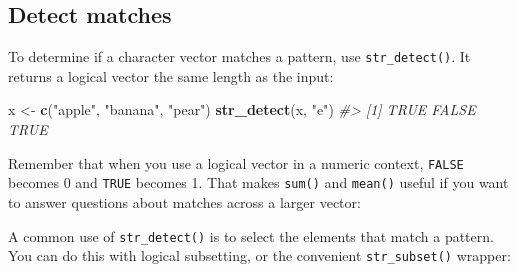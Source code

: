 \documentclass[]{book}
\newenvironment{Shaded}{\begin{snugshade}}{\end{snugshade}}
\newcommand{\CommentTok}[1]{\textcolor[rgb]{0.56,0.35,0.01}{\textit{#1}}}
\newcommand{\DecValTok}[1]{\textcolor[rgb]{0.00,0.00,0.81}{#1}}
\newcommand{\KeywordTok}[1]{\textcolor[rgb]{0.13,0.29,0.53}{\textbf{#1}}}
\newcommand{\NormalTok}[1]{#1}
\newcommand{\OperatorTok}[1]{\textcolor[rgb]{0.81,0.36,0.00}{\textbf{#1}}}
\newcommand{\StringTok}[1]{\textcolor[rgb]{0.31,0.60,0.02}{#1}}
\begin{document}
\hypertarget{detect-matches}{%
\subsection{Detect matches}\label{detect-matches}}

To determine if a character vector matches a pattern, use \texttt{str\_detect()}. It returns a logical vector the same length as the input:

\begin{Shaded}
\begin{Highlighting}[]
\NormalTok{x <-}\StringTok{ }\KeywordTok{c}\NormalTok{(}\StringTok{"apple"}\NormalTok{, }\StringTok{"banana"}\NormalTok{, }\StringTok{"pear"}\NormalTok{)}
\KeywordTok{str_detect}\NormalTok{(x, }\StringTok{"e"}\NormalTok{)}
\CommentTok{#> [1]  TRUE FALSE  TRUE}
\end{Highlighting}
\end{Shaded}

Remember that when you use a logical vector in a numeric context, \texttt{FALSE} becomes 0 and \texttt{TRUE} becomes 1. That makes \texttt{sum()} and \texttt{mean()} useful if you want to answer questions about matches across a larger vector:

\begin{Shaded}
\end{Shaded}

A common use of \texttt{str\_detect()} is to select the elements that match a pattern. You can do this with logical subsetting, or the convenient \texttt{str\_subset()} wrapper:

\begin{Shaded}
\end{Shaded}
\end{document}
